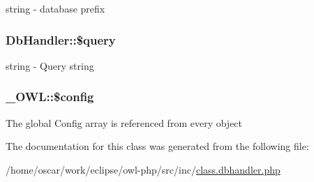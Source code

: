 string - database prefix \hypertarget{classDbHandler_d671b5596b37dac6d48a660a07775965}{
\subsubsection{\setlength{\rightskip}{0pt plus 5cm}DbHandler::\$query}}
\label{classDbHandler_d671b5596b37dac6d48a660a07775965}


string - Query string \hypertarget{class__OWL_f37a011667dda12fc417a68a6f3077d1}{
\subsubsection{\setlength{\rightskip}{0pt plus 5cm}\_\-OWL::\$config}}
\label{class__OWL_f37a011667dda12fc417a68a6f3077d1}


The global Config array is referenced from every object 

The documentation for this class was generated from the following file:\begin{CompactItemize}
\item 
/home/oscar/work/eclipse/owl-php/src/inc/\hyperlink{class_8dbhandler_8php}{class.dbhandler.php}\end{CompactItemize}

